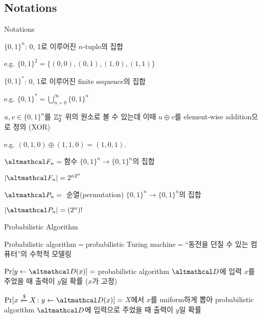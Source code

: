 \documentclass[../250428_msquare_provable_security.tex]{subfiles}
\begin{document}
\subsection{Notations}
\begin{frame}{Notations}
    \begin{itemize}
        \ii
        \(\{0,1\}^n\): 0, 1로 이루어진 \(n\)-tuple의 집합
        \begin{itemize}
            \ii e.g. \(\{0,1\}^2 = \{(0,0),(0,1),(1,0),(1,1)\}\)
        \end{itemize}

        \ii
        \(\{0,1\}^\ast\): 0, 1로 이루어진 finite sequence의 집합
        \begin{itemize}
            \ii e.g. \(\{0,1\}^\ast = \bigcup_{n=0}^\infty \{0,1\}^n\)
        \end{itemize}
        \pause

        \ii
        \(u, v \in \{0,1\}^n\)를 \(\mathbb{Z}_2^n\) 위의 원소로 볼 수 있는데
        이때 \(u \oplus v\)를 element-wise addition으로 정의 (XOR)
        \begin{itemize}
            \ii e.g. \((0,1,0) \oplus (1,1,0) = (1,0,1)\).
        \end{itemize}
        \pause

        \ii
        \(\mcal{F}_n =\mbox{}\)함수 \(\{0,1\}^n \to \{0,1\}^n\)의 집합
        \begin{itemize}
            \ii \(|\mcal{F}_n| = 2^{n 2^n}\)
        \end{itemize}

        \ii
        \(\mcal{P}_n = \mbox{}\) 순열(permutation) \(\{0,1\}^n \to \{0,1\}^n\)의 집합
        \begin{itemize}
            \ii \(|\mcal{P}_n| = (2^n)!\)
        \end{itemize}
    \end{itemize}
\end{frame}

\begin{frame}{Probabilistic Algorithm}
    \begin{itemize}
        \ii
        Probabilistic algorithm\(\mbox{} = \mbox{}\)probabilistic Turing machine\(\mbox{} =
        \mbox{}\)``동전을 던질 수 있는 컴퓨터''의 수학적 모델링
        \pause

        \ii
        \(\Pr[y \gets \mcal{D}(x)] = \mbox{}\)probabilistic algorithm \(\mcal{D}\)에
        입력 \(x\)를 주었을 때 출력이 \(y\)일 확률 (\(x\)가 고정)

        \ii
        \(\Pr[x \dgets X \colon y \gets \mcal{D}(x)] = \mbox{}\)\(X\)에서 \(x\)를 uniform하게 뽑아
        probabilistic algorithm \(\mcal{D}\)에 입력으로 주었을 때 출력이 \(y\)일 확률
    \end{itemize}
\end{frame}
\end{document}
